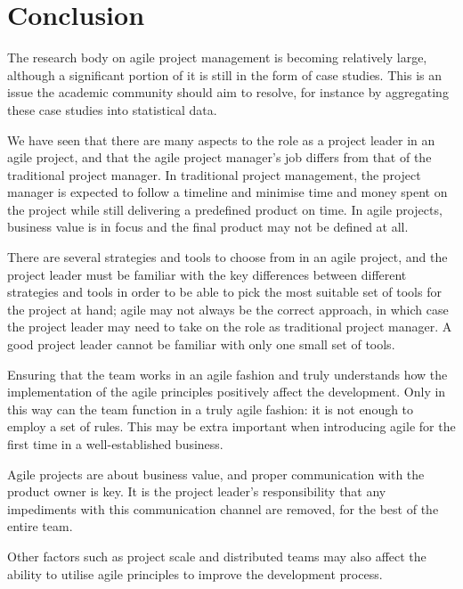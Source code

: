 \section{Conclusion}

The research body on agile project management is becoming relatively large, although a significant portion of it is still in the form of case studies. This is an issue the academic community should aim to resolve, for instance by aggregating these case studies into statistical data.

We have seen that there are many aspects to the role as a project leader in an agile project, and that the agile project manager's job differs from that of the traditional project manager. In traditional project management, the project manager is expected to follow a timeline and minimise time and money spent on the project while still delivering a predefined product on time. In agile projects, business value is in focus and the final product may not be defined at all.

There are several strategies and tools to choose from in an agile project, and the project leader must be familiar with the key differences between different strategies and tools in order to be able to pick the most suitable set of tools for the project at hand; agile may not always be the correct approach, in which case the project leader may need to take on the role as traditional project manager. A good project leader cannot be familiar with only one small set of tools.

Ensuring that the team works in an agile fashion and truly understands how the implementation of the agile principles positively affect the development. Only in this way can the team function in a truly agile fashion: it is not enough to employ a set of rules. This may be extra important when introducing agile for the first time in a well-established business.

Agile projects are about business value, and proper communication with the product owner is key. It is the project leader's responsibility that any impediments with this communication channel are removed, for the best of the entire team.

Other factors such as project scale and distributed teams may also affect the ability to utilise agile principles to improve the development process.
